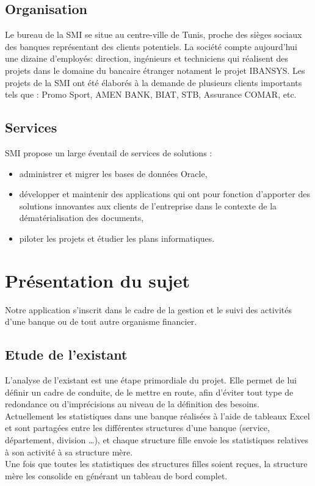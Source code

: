 \subsection{Organisation}
Le bureau de la SMI se situe au centre-ville de Tunis, proche des sièges sociaux des banques représentant des clients potentiels. La société compte aujourd'hui une dizaine d'employés: direction, ingénieurs et techniciens qui réalisent des projets dans le domaine du bancaire étranger notament le projet IBANSYS.\newline
Les projets de la SMI ont été élaborés à la demande de plusieurs clients importants tels que : Promo Sport, AMEN BANK, BIAT, STB, Assurance COMAR, etc.

\subsection{Services}
SMI propose un large éventail de services de solutions :
\begin{itemize}
    \item administrer et migrer les bases de données Oracle,
    \item développer et maintenir des applications qui ont pour fonction d'apporter des solutions innovantes aux clients de l'entreprise dans le contexte de la dématérialisation des documents,
    \item piloter les projets et étudier les plans informatiques.
\end{itemize}

\section{Présentation du sujet}
Notre application s’inscrit dans le cadre de la gestion et le suivi des activités d’une banque ou de tout autre organisme financier.
\subsection{Etude de l’existant}
L’analyse de l’existant est une étape primordiale du projet. Elle permet de lui définir un cadre de conduite, de le mettre en route, afin d’éviter tout type de redondance ou d’imprécisions au niveau de la définition des besoins.\\
Actuellement les statistiques dans une banque réalisées à l’aide de tableaux Excel et sont partagées entre les différentes structures d’une banque (service, département, division …), et chaque structure fille envoie les statistiques relatives à son activité à sa structure mère.\\
Une fois que toutes les statistiques des structures filles soient reçues, la structure mère les consolide en générant un tableau de bord complet.
